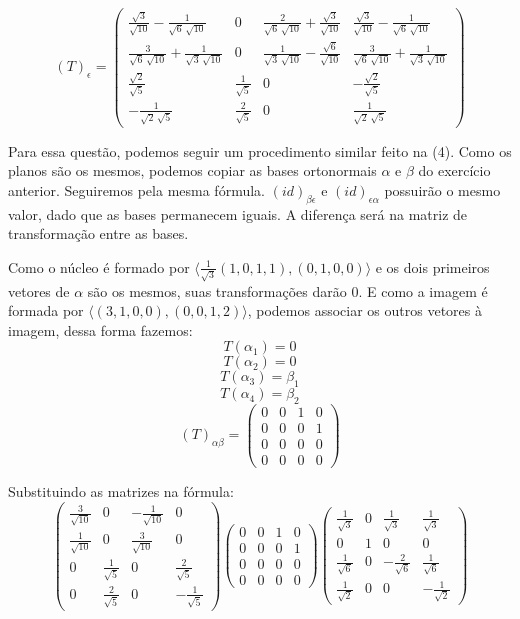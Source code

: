 \documentclass{homework}
\begin{document}
\[(T)_\epsilon = \begin{pmatrix}\frac{\sqrt{3}}{\sqrt{10}}-\frac{1}{\sqrt{6}\, \sqrt{10}} & 0 & \frac{2}{\sqrt{6}\, \sqrt{10}}+\frac{\sqrt{3}}{\sqrt{10}} & \frac{\sqrt{3}}{\sqrt{10}}-\frac{1}{\sqrt{6}\, \sqrt{10}}\\
\frac{3}{\sqrt{6}\, \sqrt{10}}+\frac{1}{\sqrt{3}\, \sqrt{10}} & 0 & \frac{1}{\sqrt{3}\, \sqrt{10}}-\frac{\sqrt{6}}{\sqrt{10}} & \frac{3}{\sqrt{6}\, \sqrt{10}}+\frac{1}{\sqrt{3}\, \sqrt{10}}\\
\frac{\sqrt{2}}{\sqrt{5}} & \frac{1}{\sqrt{5}} & 0 & -\frac{\sqrt{2}}{\sqrt{5}}\\
-\frac{1}{\sqrt{2}\, \sqrt{5}} & \frac{2}{\sqrt{5}} & 0 & \frac{1}{\sqrt{2}\, \sqrt{5}}\end{pmatrix}\]

\exercise*
Para essa questão, podemos seguir um procedimento similar feito na (4). Como os planos são os mesmos, podemos copiar as bases ortonormais $\alpha$ e $\beta$ do exercício anterior. Seguiremos pela mesma fórmula. $(id)_{\beta\epsilon}$ e $(id)_{\epsilon\alpha}$ possuirão o mesmo valor, dado que as bases permanecem iguais. A diferença será na matriz de transformação entre as bases.

Como o núcleo é formado por $\langle\frac{1}{\sqrt{3}}(1,0,1,1),(0,1,0,0)\rangle$ e os dois primeiros vetores de $\alpha$ são os mesmos, suas transformações darão $0$. E como a imagem é formada por $\langle(3,1,0,0),(0,0,1,2)\rangle$, podemos associar os outros vetores à imagem, dessa forma fazemos:
\[T(\alpha_1) = 0\]
\[T(\alpha_2) = 0\]
\[T(\alpha_3) = \beta_1\]
\[T(\alpha_4) = \beta_2\]
\[(T)_{\alpha\beta} = 
\begin{pmatrix}
0 & 0 & 1 & 0\\
0 & 0 & 0 & 1\\
0 & 0 & 0 & 0\\
0 & 0 & 0 & 0
\end{pmatrix}\]

Substituindo as matrizes na fórmula:
\[\begin{pmatrix}\frac{3}{\sqrt{10}} & 0 & -\frac{1}{\sqrt{10}} & 0\\
\frac{1}{\sqrt{10}} & 0 & \frac{3}{\sqrt{10}} & 0\\
0 & \frac{1}{\sqrt{5}} & 0 & \frac{2}{\sqrt{5}}\\
0 & \frac{2}{\sqrt{5}} & 0 & -\frac{1}{\sqrt{5}}\end{pmatrix}
\begin{pmatrix}
0 & 0 & 1 & 0\\
0 & 0 & 0 & 1\\
0 & 0 & 0 & 0\\
0 & 0 & 0 & 0
\end{pmatrix}
\begin{pmatrix}\frac{1}{\sqrt{3}} & 0 & \frac{1}{\sqrt{3}} & \frac{1}{\sqrt{3}}\\
0 & 1 & 0 & 0\\
\frac{1}{\sqrt{6}} & 0 & -\frac{2}{\sqrt{6}} & \frac{1}{\sqrt{6}}\\
\frac{1}{\sqrt{2}} & 0 & 0 & -\frac{1}{\sqrt{2}}\end{pmatrix}\]
\end{document}
